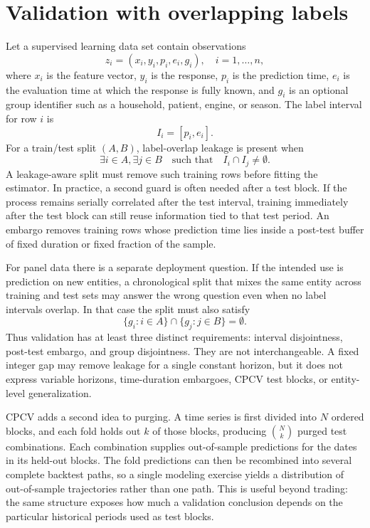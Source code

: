 \documentclass[article]{jdssv}
\begin{document}
\section{Validation with overlapping labels}

Let a supervised learning data set contain observations
\[
  z_i = (x_i, y_i, p_i, e_i, g_i), \quad i = 1,\ldots,n,
\]
where $x_i$ is the feature vector, $y_i$ is the response, $p_i$ is the
prediction time, $e_i$ is the evaluation time at which the response is fully
known, and $g_i$ is an optional group identifier such as a household, patient,
engine, or season. The label interval for row $i$ is
\[
  I_i = [p_i, e_i].
\]
For a train/test split $(A, B)$, label-overlap leakage is present when
\[
  \exists i \in A, \exists j \in B
  \quad \text{such that} \quad I_i \cap I_j \ne \emptyset .
\]
A leakage-aware split must remove such training rows before fitting the
estimator. In practice, a second guard is often needed after a test block. If the
process remains serially correlated after the test interval, training
immediately after the test block can still reuse information tied to that test
period. An embargo removes training rows whose prediction time lies inside a
post-test buffer of fixed duration or fixed fraction of the sample.

For panel data there is a separate deployment question. If the intended use is
prediction on new entities, a chronological split that mixes the same entity
across training and test sets may answer the wrong question even when no label
intervals overlap. In that case the split must also satisfy
\[
  \{g_i: i \in A\} \cap \{g_j: j \in B\} = \emptyset .
\]
Thus validation has at least three distinct requirements: interval disjointness,
post-test embargo, and group disjointness. They are not interchangeable. A fixed
integer gap may remove leakage for a single constant horizon, but it does not
express variable horizons, time-duration embargoes, CPCV test blocks, or
entity-level generalization.

CPCV adds a second idea to purging. A time series is first divided into $N$
ordered blocks, and each fold holds out $k$ of those blocks, producing
$\binom{N}{k}$ purged test combinations. Each combination supplies
out-of-sample predictions for the dates in its held-out blocks. The fold
predictions can then be recombined into several complete backtest paths, so a
single modeling exercise yields a distribution of out-of-sample trajectories
rather than one path. This is useful beyond trading: the same structure exposes
how much a validation conclusion depends on the particular historical periods
used as test blocks.
\end{document}
